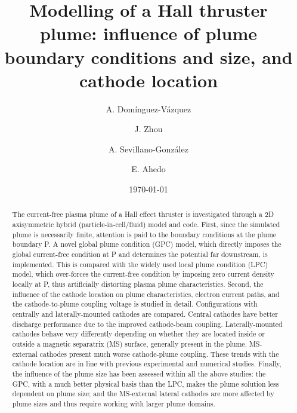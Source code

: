 \documentclass[%
 aip,
cha,
 amsmath,amssymb,
 reprint,%
]{revtex4-1}
\begin{document}
\title{Modelling of a Hall thruster plume: influence of plume boundary conditions and size, and cathode location}


\author{A. Domínguez-Vázquez}
 
\author{J. Zhou}
\author{A. Sevillano-González}
\author{E. Ahedo}

\date{\today}%



\begin{abstract}
    The current-free plasma plume of a Hall effect thruster is investigated through a 2D axisymmetric hybrid (particle-in-cell/fluid) model and code. First, since the simulated plume is necessarily finite, attention is paid to the boundary conditions at the plume boundary P. A novel global plume condition (GPC) model, which directly imposes the global current-free condition at P and determines the potential far downstream, is implemented. This is compared with the widely used local plume condition (LPC) model, which over-forces the current-free condition by imposing zero current density locally at P, thus artificially distorting plasma plume characteristics. Second, the influence of the cathode location on plume characteristics, electron current paths, and the cathode-to-plume coupling voltage is studied in detail. Configurations with centrally and laterally-mounted cathodes are compared. Central cathodes have better discharge performance due to the improved cathode-beam coupling. Laterally-mounted cathodes behave very differently depending on whether they are located inside or outside a magnetic separatrix (MS) surface, generally present in the plume. MS-external cathodes present much worse cathode-plume coupling. These trends with the cathode location are in line with previous experimental and numerical studies. Finally, the influence of the plume size has been assessed within all the above studies: the GPC, with a much better physical basis than the LPC, makes the plume solution less dependent on plume size; and the MS-external lateral cathodes are more affected by plume sizes and thus require working with larger plume domains.
\end{abstract}
\end{document}

